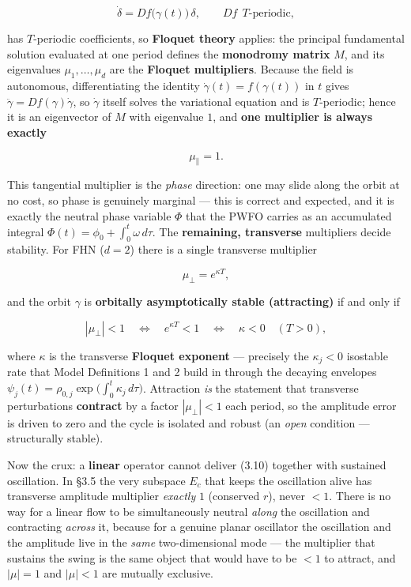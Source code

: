 \documentclass[
  11pt,
]{article}
\providecommand{\lt}{<}
\providecommand{\gt}{>}
\begin{document}
\[
\dot{\delta} = Df\big(\gamma(t)\big)\,\delta ,\qquad Df\ \ T\text{-periodic},
\]

has \(T\)-periodic coefficients, so \textbf{Floquet theory} applies: the
principal fundamental solution evaluated at one period defines the
\textbf{monodromy matrix} \(M\), and its eigenvalues
\(\mu_1,\dots,\mu_d\) are the \textbf{Floquet multipliers}. Because the
field is autonomous, differentiating the identity
\(\dot\gamma(t)=f(\gamma(t))\) in \(t\) gives
\(\ddot\gamma=Df(\gamma)\dot\gamma\), so \(\dot\gamma\) itself solves
the variational equation and is \(T\)-periodic; hence it is an
eigenvector of \(M\) with eigenvalue \(1\), and \textbf{one multiplier
is always exactly}

\[
\mu_{\parallel}=1 .
\tag{3.9}
\]

This tangential multiplier is the \emph{phase} direction: one may slide
along the orbit at no cost, so phase is genuinely marginal --- this is
correct and expected, and it is exactly the neutral phase variable
\(\Phi\) that the PWFO carries as an accumulated integral
\(\Phi(t)=\phi_0+\int_0^t\omega\,d\tau\). The \textbf{remaining,
transverse} multipliers decide stability. For FHN (\(d=2\)) there is a
single transverse multiplier

\[
\mu_{\perp}=e^{\kappa T},
\]

and the orbit \(\gamma\) is \textbf{orbitally asymptotically stable
(attracting)} if and only if

\[
|\mu_{\perp}|\lt 1
\quad\Longleftrightarrow\quad
e^{\kappa T}\lt 1
\quad\Longleftrightarrow\quad
\kappa\lt 0 \quad(T\gt 0),
\tag{3.10}
\]

where \(\kappa\) is the transverse \textbf{Floquet exponent} ---
precisely the \(\kappa_j\lt 0\) isostable rate that Model Definitions 1
and 2 build in through the decaying envelopes
\(\psi_j(t)=\rho_{0,j}\exp\!\big(\int_0^t\kappa_j\,d\tau\big)\).
Attraction \emph{is} the statement that transverse perturbations
\textbf{contract} by a factor \(|\mu_\perp|\lt 1\) each period, so the
amplitude error is driven to zero and the cycle is isolated and robust
(an \emph{open} condition --- structurally stable).

Now the crux: a \textbf{linear} operator cannot deliver (3.10) together
with sustained oscillation. In §3.5 the very subspace \(E_c\) that keeps
the oscillation alive has transverse amplitude multiplier \emph{exactly}
\(1\) (conserved \(r\)), never \(\lt 1\). There is no way for a linear
flow to be simultaneously neutral \emph{along} the oscillation and
contracting \emph{across} it, because for a genuine planar oscillator
the oscillation and the amplitude live in the \emph{same}
two-dimensional mode --- the multiplier that sustains the swing is the
same object that would have to be \(\lt 1\) to attract, and \(|\mu|=1\)
and \(|\mu|\lt 1\) are mutually exclusive.
\end{document}
